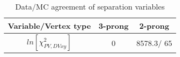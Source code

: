 \documentclass{article}
\begin{document}
\begin{table}[htbp]
\caption{\label{tab:sepVars}Data/MC agreement of separation variables}
\begin{center}
\begin{tabular}{c|c|c}
Variable/Vertex type & 3-prong & 2-prong\\
\hline
$ln[\chi^{2}_{PV,DV xy}]$ & 0 & 8578.3/ 65\\
\hline
\end{tabular}
\end{center}
\end{table}
\end{document}
